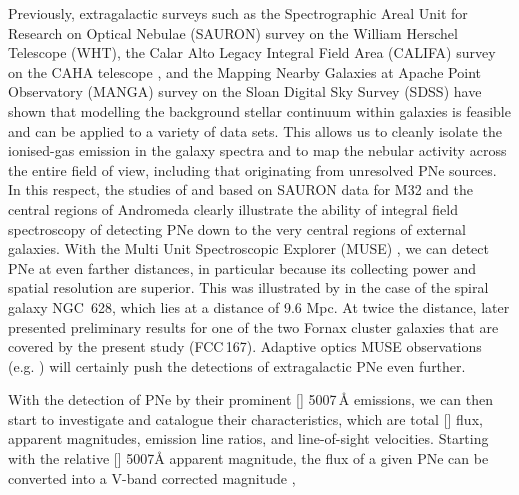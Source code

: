 \documentclass{aa}
\begin{document}
Previously, extragalactic surveys such as the Spectrographic Areal Unit for Research on Optical Nebulae (SAURON) survey \citep{bacon_sauron_2001} on the William Herschel Telescope (WHT), the Calar Alto Legacy Integral Field Area (CALIFA) survey \citep{sanchez_califa_2011} on the CAHA telescope \citep{roth_psf-fitting_2006}, and the Mapping Nearby Galaxies at Apache Point Observatory (MANGA) survey \citep{bundy_overview_2014} on the Sloan Digital Sky Survey (SDSS) \citep{york_sloan_2000} have shown that modelling the background stellar continuum within galaxies is feasible and can be applied to a variety of data sets. This allows us to cleanly isolate the ionised-gas emission in the galaxy spectra and to map the nebular activity across the entire field of view, including that originating from unresolved PNe sources. In this respect, the studies of \citet{sarzi_planetary_2011} and \citet{pastorello_planetary_2013} based on SAURON data for M32 and the central regions of Andromeda clearly illustrate the ability of integral field spectroscopy of detecting PNe down to the very central regions of external galaxies. With the Multi Unit Spectroscopic Explorer (MUSE) \citep{bacon_muse_2010}, we can detect PNe at even farther distances, in particular because its collecting power and spatial resolution are superior. This was illustrated by \citet{kreckel_revised_2017} in the case of the spiral galaxy NGC~628, which lies at a distance of 9.6 Mpc. At twice the distance, \citet{sarzi_fornax3d_2018} later presented preliminary results for one of the two Fornax cluster galaxies that are covered by the present study (FCC\,167). Adaptive optics MUSE observations (e.g. \citet{fahrion_constraining_2019}) will certainly push the detections of extragalactic PNe even further. 


With the detection of PNe by their prominent [] 5007\,\AA{} emissions, we can then start to investigate and catalogue their characteristics, which are total [] flux, apparent magnitudes, emission line ratios, and line-of-sight velocities. Starting with the relative [] 5007\AA{} apparent magnitude, the flux of a given PNe can be converted into a V-band corrected magnitude \citep[][Eq.~\ref{eq:m5007}]{ciardullo_planetary_1989},
\end{document}

